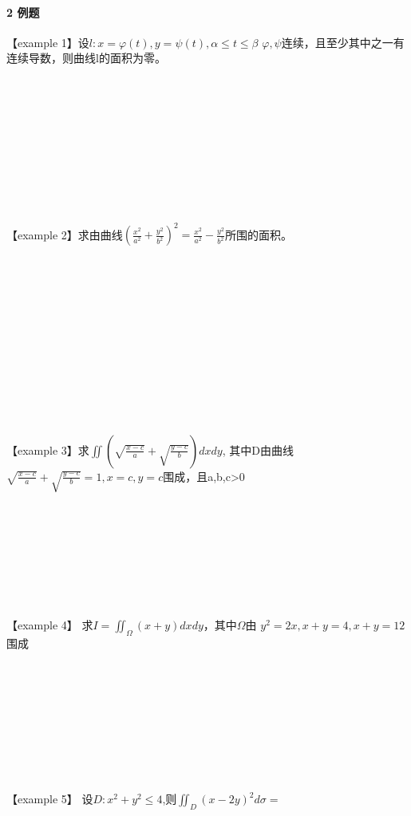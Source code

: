 \documentclass[12pt]{scrartcl}
\begin{document}
{\paragraph*{\large 2 例题}\leavevmode \newline
【example 1】设$l:x=\varphi (t),y=\psi(t),\alpha\leq t\leq \beta  $
$\varphi,\psi$连续，且至少其中之一有连续导数，则曲线l的面积为零。
\\
\\
\\
\\
\\
\\
\\
\\
\\
\\
\\
【example 2】求由曲线$(\frac{x^2}{a^2}+\frac{y^2}{b^2})^2=\frac{x^2}{a^2}-\frac{y^2}{b^2}$所围的面积。
\\
\\
\\
\\
\\
\\
\\
\\
\\
\\
\\
\\
\\
【example 3】求$\iint (\sqrt{\frac{x-c}{a}}+\sqrt{\frac{y-c}{b}})dxdy$,
其中D由曲线$\sqrt{\frac{x-c}{a}}+\sqrt{\frac{y-c}{b}}=1,x=c,y=c$围成，且a,b,c>0
\\
\\
\\
\\
\\
\\
\\
\\
\\
【example 4】 求$I=\iint _\varOmega (x+y)dxdy$，其中$\varOmega $由
$y^2=2x,x+y=4,x+y=12$围成  \\
\\
\\
\\
\\
\\
\\
\\
\\
\\
【example 5】 设$D:x^2+y^2\leq 4$,则$\iint_D(x-2y)^2 d\sigma=$  \\
}
\end{document}
